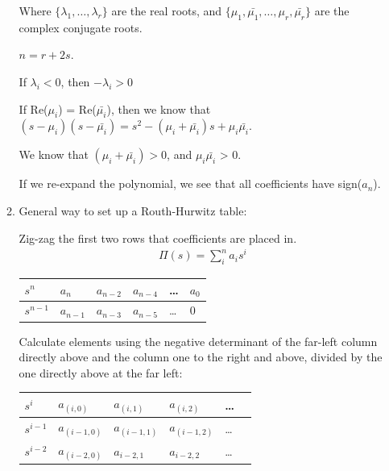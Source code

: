 \begin{enumerate}
\begin{enumerate}
                    Where $\{ \lambda_1, \ldots, \lambda_r \}$ are the real roots, and
                    $\{ \mu_1, \bar{\mu_1}, \ldots, \mu_r, \bar{\mu_r} \}$ are the complex conjugate roots.

                    $n = r + 2s$.

                    If $\lambda_i < 0$, then $- \lambda_i > 0$

                    If Re($\mu_i$) = Re($\bar{\mu_i}$), then we know that $(s - \mu_i)(s - \bar{\mu_i}) = s^2 - (\mu_i + \bar{\mu_i}) s + \mu_i \bar{\mu_i}$.

                    We know that $(\mu_i + \bar{\mu_i}) > 0$, and $ \mu_i \bar{\mu_i}$ > 0.

                    If we re-expand the polynomial, we see that all coefficients have sign($a_n$).

                \item General way to set up a Routh-Hurwitz table:

                    Zig-zag the first two rows that coefficients are placed in.
                    \begin{align*}
                        \Pi(s) = \sum_i^n a_i s^i
                    \end{align*}
                    \begin{table}[h]
                        \centering
                        \begin{tabular}{ | l || l | l | l | l | l | }
                            \hline
                            \hline
                            $s^n$ & $a_n$ & $a_{n-2}$ & $a_{n-4}$ & \ldots & $a_0$ \\ \hline
                            $s^{n-1}$ & $a_{n-1}$ & $a_{n-3}$ & $a_{n-5}$ & \ldots & $0$\\ \hline
                        \end{tabular}
                    \end{table}

                    Calculate elements using the negative determinant of the far-left column directly above and the column one to the right and above, divided by the one directly above at the far left:

                    \begin{table}[h]
                        \centering
                        \begin{tabular}{ | l || l | l | l | l | l | }
                            \hline
                            \hline
                            $s^i$ & $a_{(i, 0)}$ & $a_{(i, 1)}$  & $a_{(i, 2)}$ & \ldots \\ \hline
                            $s^{i-1}$ & $a_{(i-1, 0)}$ & $a_{(i-1, 1)}$  & $a_{(i-1, 2)}$ & \ldots \\ \hline
                            $s^{i-2}$ & $a_{(i-2, 0)}$ & $a_{i-2, 1}$  & $a_{i-2, 2}$ & \ldots \\ \hline
                        \end{tabular}
                    \end{table}


\end{enumerate}
\end{enumerate}
